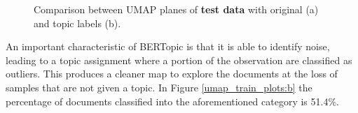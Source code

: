\documentclass[a4paper]{article}
\begin{document}
\begin{figure}[H]
  \centering
  \caption{Comparison between UMAP planes of \textbf{test data} with original (a) and topic labels (b).}
  \label{umap_test_plots}
\end{figure}

An important characteristic of BERTopic is that it is able to identify noise, leading to a topic assignment where a portion of the observation are classified as outliers. This produces a cleaner map to explore the documents at the loss of samples that are not given a topic. In Figure \ref{umap_train_plots:b} the percentage of documents classified into the aforementioned category is 51.4\%.
\end{document}
